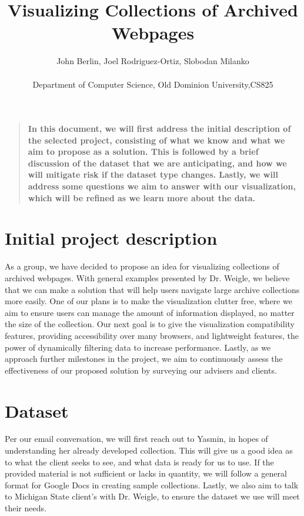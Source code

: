 \documentclass[12pt]{article}
\title{Visualizing Collections of Archived Webpages}
\author
{John Berlin, Joel Rodriguez-Ortiz, Slobodan Milanko\\
\\
\normalsize{Department of Computer Science, Old Dominion University,CS825}\\
}
\date{}
\newenvironment{sciabstract}{%
\begin{quote} \bf}
{\end{quote}}
\begin{document}
 
\baselineskip24pt
\maketitle 

\begin{sciabstract}
  In this document, we will first address the initial description of the selected project, consisting of what we know and what we aim to propose as a solution. This is followed by a brief discussion of the dataset that we are anticipating, and how we will mitigate risk if the dataset type changes. Lastly, we will address some questions we aim to answer with our visualization, which will be refined as we learn more about the data.
  
\end{sciabstract}


\section*{Initial project description}

As a group, we have decided to propose an idea for visualizing collections of archived webpages. With general examples presented by Dr. Weigle, we believe that we can make a solution that will help users navigate large archive collections more easily. One of our plans is to make the visualization clutter free, where we aim to ensure users can manage the amount of information displayed, no matter the size of the collection. Our next goal is to give the visualization compatibility features, providing accessibility over many browsers, and lightweight features, the power of dynamically filtering data to increase performance. Lastly, as we approach further milestones in the project, we aim to continuously assess the effectiveness of our proposed solution by surveying our advisers and clients.

\section*{Dataset}

Per our email conversation, we will first reach out to Yasmin, in hopes of understanding her already developed collection. This will give us a good idea as to what the client seeks to see, and what data is ready for us to use. If the provided material is not sufficient or lacks in quantity, we will follow a general format for Google Docs in creating sample collections. Lastly, we also aim to talk to Michigan State client's with Dr. Weigle, to ensure the dataset we use will meet their needs.
\end{document}
